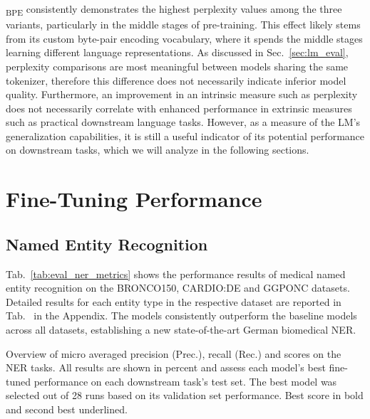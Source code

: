 \ChristBERT\textsubscript{BPE} consistently demonstrates the highest perplexity
values among the three variants, particularly in the middle stages of
pre-training. This effect likely stems from its custom byte-pair
encoding vocabulary, where it spends the middle stages learning different
language representations. As discussed in Sec.~\ref{sec:lm_eval}, perplexity
comparisons are most meaningful between models sharing the same tokenizer,
therefore this difference does not necessarily indicate inferior model quality.
Furthermore, an improvement in an intrinsic measure such as perplexity does not
necessarily correlate with enhanced performance in extrinsic measures such as
practical downstream language tasks. However, as a measure of the LM's
generalization capabilities, it is still a useful indicator of its potential
performance on downstream tasks, which we will analyze in the following
sections.

\section{Fine-Tuning Performance}

\subsection{Named Entity Recognition}

Tab.~\ref{tab:eval_ner_metrics} shows the performance results of medical
named entity recognition on the BRONCO150, CARDIO:DE and GGPONC datasets.
Detailed results for each entity type in the respective dataset are reported in
Tab.~ in the Appendix. The
\ChristBERT{} models consistently outperform the baseline models across all
datasets, establishing a new state-of-the-art German biomedical NER.

\begin{table}[htbp]
    \centering
     
    \caption[Overview of micro averaged precision, recall and \ff{} scores
    achieved on the NER tasks]{Overview of micro averaged precision (Prec.),
    recall (Rec.) and \ff{} scores on the NER tasks. All results are shown in
    percent and assess each model's best fine-tuned performance on each
    downstream task's test set. The best model was selected out of 28 runs based
    on its validation set performance. Best score in bold and second best
    underlined.}
    \label{tab:eval_ner_metrics}
\end{table}

